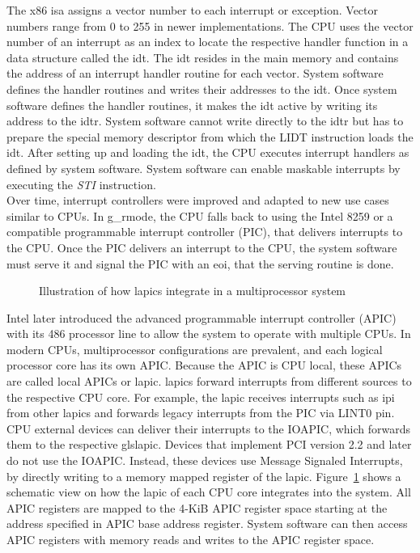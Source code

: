 The x86 \gls{isa} assigns a vector number to each interrupt or exception. Vector
numbers range from 0 to 255 in newer implementations. The CPU uses the vector
number of an interrupt as an index to locate the respective handler function in
a data structure called the \gls{idt}. The \gls{idt} resides in the main memory
and contains the address of an interrupt handler routine for each vector. System
software defines the handler routines and writes their addresses to the
\gls{idt}. Once system software defines the handler routines, it makes the
\gls{idt} active by writing its address to the \gls{idtr}. System software
cannot write directly to the \gls{idtr} but has to prepare the special memory
descriptor from which the LIDT instruction loads the \gls{idt}. After setting up
and loading the \gls{idt}, the CPU executes interrupt handlers as defined by
system software. System software can enable maskable interrupts by executing the
\textit{STI} instruction.\\

Over time, interrupt controllers were improved and adapted to new use cases
similar to CPUs. In \gls{g_rmode}, the CPU falls back to using the Intel 8259 or
a compatible programmable interrupt controller (PIC), that delivers
interrupts to the CPU. Once the PIC delivers an interrupt to the CPU, the system
software must serve it and signal the PIC with an \gls{eoi}, that the serving
routine is done. \\

\begin{figure}
  \begin{center}
    
    \caption{Illustration of how \glspl{lapic} integrate in a
    multiprocessor system}
    \label{fig:state:technical:lapic}
  \end{center}
\end{figure}

Intel later introduced the advanced programmable interrupt controller (APIC)
with its 486 processor line to allow the system to operate with multiple CPUs.
In modern CPUs, multiprocessor configurations are prevalent, and each logical
processor core has its own APIC. Because the APIC is CPU local, these APICs are
called local APICs or \gls{lapic}. \glspl{lapic} forward interrupts from
different sources to the respective CPU core. For example, the \gls{lapic}
receives interrupts such as \gls{ipi} from other \glspl{lapic} and forwards
legacy interrupts from the PIC via LINT0 pin. CPU external devices can deliver
their interrupts to the IOAPIC, which forwards them to the respective
gls{lapic}. Devices that implement PCI version 2.2 and later do not use the
IOAPIC. Instead, these devices use Message Signaled Interrupts, by directly
writing to a memory mapped register of the \gls{lapic}.
Figure~\ref{fig:state:technical:lapic} shows a schematic view on how the
\gls{lapic} of each CPU core integrates into the system. All APIC registers are
mapped to the 4-KiB APIC register space starting at the address specified
in APIC base address register. System software can then access APIC registers
with memory reads and writes to the APIC register space.

